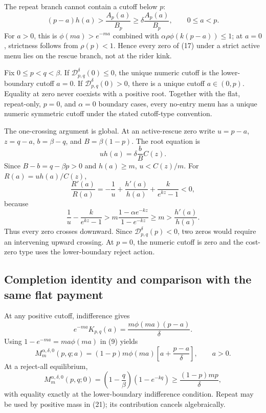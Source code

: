 \documentclass[mnsc,dblanonrev]{informs4}
\newcommand{\ph}{\phi}
\begin{document}
The repeat branch cannot contain a cutoff below $p$:
\[
 (p-a)h(a)>\frac{A_p(a)}{B_p}
 \ge\delta\frac{A_p(a)}{B_p},\qquad 0\le a<p.              \tag{18}
\]
For $a>0$, this is $\ph(ma)>e^{-ma}$ combined with
$\alpha\rho\ph(k(p-a))\le1$; at $a=0$, strictness follows from
$\rho(p)<1$.  Hence every zero of (17) under a strict active menu lies on the
rescue branch, not at the rider kink.

\begin{theorem}
\label{thm:unique}
Fix $0\le p<q<\beta$.  If $\mathcal D_{p,q}^{\delta}(0)\le0$, the unique numeric
cutoff is the lower-boundary cutoff $a=0$.  If
$\mathcal D_{p,q}^{\delta}(0)>0$, there is a unique cutoff $a\in(0,p)$.  Equality at
zero never coexists with a positive root.  Together with the flat,
repeat-only, $p=0$, and $\alpha=0$ boundary cases, every no-entry menu has a
unique numeric symmetric cutoff under the stated cutoff-type convention.
\end{theorem}

The one-crossing argument is global.  At an active-rescue zero write
$u=p-a$, $z=q-a$, $b=\beta-q$, and $B=\beta(1-p)$.  The root equation is
\[
 uh(a)=\delta\frac bB C(z).
\]
Since $B-b=q-\beta p>0$ and $h(a)\ge m$, $u<C(z)/m$.  For
$R(a)=u h(a)/C(z)$,
\[
 \frac{R'(a)}{R(a)}
 =-\frac1u+\frac{h'(a)}{h(a)}+\frac{k}{e^{kz}-1}<0,          \tag{19}
\]
because
\[
 \frac1u-\frac{k}{e^{kz}-1}
 >m\frac{1-\alpha e^{-kz}}{1-e^{-kz}}
 \ge m>\frac{h'(a)}{h(a)}.
\]
Thus every zero crosses downward.  Since
$\mathcal D_{p,q}^{\delta}(p)<0$, two zeros would require an intervening upward
crossing.  At $p=0$, the numeric cutoff is zero and the cost-zero type uses
the lower-boundary reject action.

\subsection{Completion identity and comparison with the same flat payment}

At any positive cutoff, indifference gives
\[
 e^{-ma}K_{p,q}(a)=\frac{m\ph(ma)(p-a)}\delta.
\]
Using $1-e^{-ma}=ma\ph(ma)$ in (9) yields
\[
 M_m^{\alpha,\delta,0}(p,q;a)
 =(1-p)m\ph(ma)\left[a+\frac{p-a}\delta\right],
 \qquad a>0.                                                \tag{20}
\]
At a reject-all equilibrium,
\[
 M_m^{\alpha,\delta,0}(p,q;0)=
 \left(1-\frac q\beta\right)(1-e^{-kq})
 \ge\frac{(1-p)mp}{\delta},                                \tag{21}
\]
with equality exactly at the lower-boundary indifference condition.  Repeat
may be used by positive mass in (21); its contribution cancels algebraically.
\end{document}
